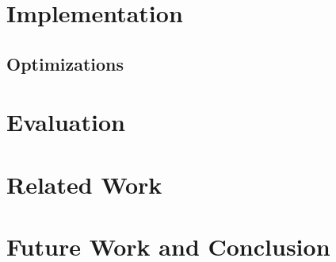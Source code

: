 \documentclass[12pt]{article}
\begin{document}
   
   
\section*{Implementation}

   \subsection*{Optimizations}


\section*{Evaluation}


\section*{Related Work}


\section*{Future Work and Conclusion}




\end{document}
